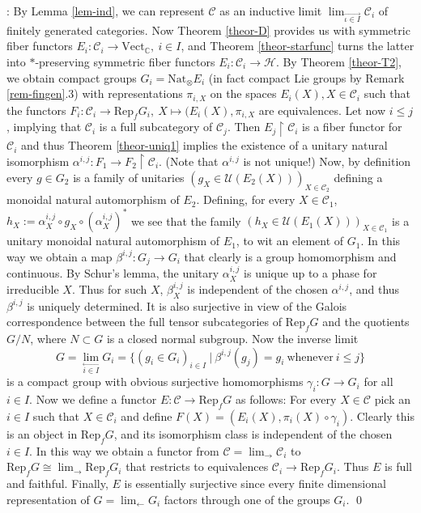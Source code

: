 \documentclass[12pt]{article}
\theoremstyle{definition}
\theoremstyle{definition}
\theoremstyle{remark}
\newcommand{\Vect}{\mathrm{Vect}}
\newcommand{\restr}{\upharpoonright}
\def\2#1{{\mathcal #1}}
\def\7#1{{\mathbb #1}}
\newcommand{\Rep}{\mathrm{Rep}}
\newcommand{\rarr}{\rightarrow}
\newcommand{\Nat}{\mathrm{Nat}}
\begin{document}
: By Lemma
\ref{lem-ind}, we can represent $\2C$ as an inductive limit
$\lim_{\stackrel{\longrightarrow}{\iota\in I}}\2C_i$ of finitely
generated categories.  Now Theorem \ref{theor-D} provides us with
symmetric fiber functors $E_i:\2C_i\rarr\Vect_\7C,\ i\in I$, and
Theorem \ref{theor-starfunc} turns the latter into $*$-preserving
symmetric fiber functors $E_i:\2C_i\rarr\2H$. By Theorem
\ref{theor-T2}, we obtain compact groups $G_i=\Nat_\otimes E_i$ (in
fact compact Lie groups by Remark \ref{rem-fingen}.3) with
representations $\pi_{i,X}$ on the spaces $E_i(X),X\in\2C_i$ such that
the functors $F_i: \2C_i\rarr\Rep_fG_i,\ X\mapsto(E_i(X),\pi_{i,X}$
are equivalences. Let now $i\le j$, implying that $\2C_i$ is a full
subcategory of $\2C_j$. Then $E_j\restr\2C_i$ is a fiber functor for
$\2C_i$ and thus Theorem \ref{theor-uniq1} implies the existence of a
unitary natural isomorphism $\alpha^{i,j}: F_1\rarr F_2\restr\2C_i$.
(Note that $\alpha^{i,j}$ is not unique!) Now, by definition every
$g\in G_2$ is a family of unitaries $(g_X\in\2U(E_2(X)))_{X\in\2C_2}$
defining a monoidal natural automorphism of $E_2$. Defining, for every
$X\in\2C_1$, $h_X:=\alpha^{i,j}_X\circ g_X\circ(\alpha^{i,j}_X)^*$ we
see that the family $(h_X\in\2U(E_1(X)))_{X\in\2C_1}$ is a unitary
monoidal natural automorphism of $E_1$, to wit an element of $G_1$. In
this way we obtain a map $\beta^{i,j}: G_j\rarr G_i$ that clearly is a
group homomorphism and continuous. By Schur's lemma, the unitary
$\alpha^{i,j}_X$ is unique up to a phase for irreducible $X$. Thus for
such $X$, $\beta^{i,j}_X$ is independent of the chosen $\alpha^{i,j}$,
and thus $\beta^{i,j}$ is uniquely determined. It is also surjective
in view of the Galois correspondence between the full tensor
subcategories of $\Rep_fG$ and the quotients $G/N$, where $N\subset G$
is a closed normal subgroup. Now the inverse limit
\[ G=\lim_{\stackrel{\longleftarrow}{i\in I}} G_i = \{ (g_i\in
G_i)_{i\in I}\ | \ \beta^{i,j}(g_j)=g_i\ \mathrm{whenever}\ i\le j \}
\] is a compact group with obvious surjective homomorphisms
$\gamma_i:G\rarr G_i$ for all $i\in I$.  Now we define a functor $E:
\2C\rarr\Rep_fG$ as follows: For every $X\in\2C$ pick an $i\in I$ such
that $X\in\2C_i$ and define $F(X)=(E_i(X),\pi_i(X)\circ\gamma_i)$.
Clearly this is an object in $\Rep_fG$, and its isomorphism class is
independent of the chosen $i\in I$. In this way we obtain a functor
from $\2C=\lim_\rightarrow\2C_i$ to
$\Rep_fG\cong\lim_\rightarrow\Rep_fG_i$ that restricts to equivalences
$\2C_i\rarr\Rep_fG_i$. Thus $E$ is full and faithful. Finally, $E$ is
essentially surjective since every finite dimensional representation
of $G=\lim_\leftarrow G_i$ factors through one of the groups $G_i$.
\qed
\end{document}

